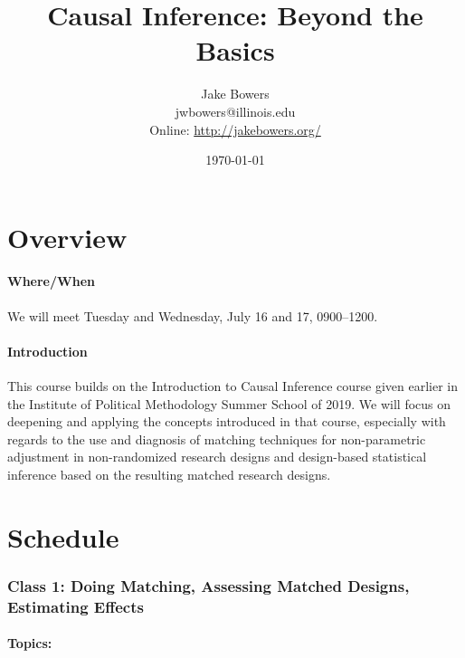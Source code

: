 \documentclass[10pt]{article}
\title{Causal Inference: Beyond the Basics}
\author{Jake Bowers \\
  \small{jwbowers@illinois.edu \\
    Online:
    \url{http://jakebowers.org/}}
}
\date{\today}
\makeatletter
\def\maketitle{%
  \thispagestyle{empty}%
  \begin{center}\leavevmode
    \normalfont
    {\large \bfseries\@title\par}%
    {\large \@author\par}%
    {\large \@date\par}%
  \end{center}%
  \null }
\makeatother
\begin{document}
\maketitle



  \part*{Overview}

  \subsection*{Where/When}

  We will meet Tuesday and Wednesday, July 16 and 17, 0900--1200.

  \subsection*{Introduction}

  This course builds on the Introduction to Causal Inference course given
  earlier in the Institute of Political Methodology Summer School of 2019. We
  will focus on deepening and applying the concepts introduced in that course,
  especially with regards to the use and diagnosis of matching techniques for non-parametric
  adjustment in non-randomized research designs and design-based statistical
  inference based on the resulting matched research designs.

  \part*{Schedule}


\section*{Class 1: Doing Matching, Assessing Matched Designs, Estimating Effects}

\subsection*{Topics:}
\end{document}
